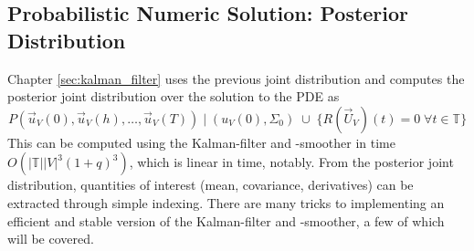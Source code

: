 \subsection*{Probabilistic Numeric Solution: Posterior Distribution}
Chapter \ref{sec:kalman_filter} uses the previous joint distribution and computes the posterior joint distribution over the solution to the PDE as $$P(\vec{u}_V(0), \vec{u}_V(h), \dots, \vec{u}_V(T)) \;\Big| \; (u_V(0), \Sigma_0) \; \cup \; \{R(\vec{U}_V)(t) = 0 \; \forall t \in \mathbb{T}\}$$ This can be computed using the Kalman-filter and -smoother in time $O(|\mathbb{T}||V|^3(1+q)^3)$, which is linear in time, notably. From the posterior joint distribution, quantities of interest (mean, covariance, derivatives) can be extracted through simple indexing.
There are many tricks to implementing an efficient and stable version of the Kalman-filter and -smoother, a few of which will be covered.


\ifdefined\COMPILINGFROMMAIN
\else    
    
\fi